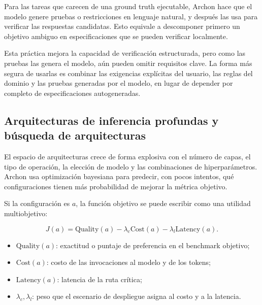 \documentclass[a4paper]{article}
\begin{document}
Para las tareas que carecen de una ground truth ejecutable, Archon hace que el modelo genere pruebas o restricciones en lenguaje natural, y después las usa para verificar las respuestas candidatas. Esto equivale a descomponer primero un objetivo ambiguo en especificaciones que se pueden verificar localmente.


Esta práctica mejora la capacidad de verificación estructurada, pero como las pruebas las genera el modelo, aún pueden omitir requisitos clave. La forma más segura de usarlas es combinar las exigencias explícitas del usuario, las reglas del dominio y las pruebas generadas por el modelo, en lugar de depender por completo de especificaciones autogeneradas.

\subsection{Arquitecturas de inferencia profundas y búsqueda de arquitecturas}


El espacio de arquitecturas crece de forma explosiva con el número de capas, el tipo de operación, la elección de modelo y las combinaciones de hiperparámetros. Archon usa optimización bayesiana para predecir, con pocos intentos, qué configuraciones tienen más probabilidad de mejorar la métrica objetivo.


Si la configuración es $a$, la función objetivo se puede escribir como una utilidad multiobjetivo:

$$
J(a)=\mathrm{Quality}(a)-\lambda_c\mathrm{Cost}(a)-\lambda_l\mathrm{Latency}(a).
$$

\begin{itemize}
    \item $\mathrm{Quality}(a)$: exactitud o puntaje de preferencia en el benchmark objetivo;
    \item $\mathrm{Cost}(a)$: costo de las invocaciones al modelo y de los tokens;
    \item $\mathrm{Latency}(a)$: latencia de la ruta crítica;
    \item $\lambda_c,\lambda_l$: peso que el escenario de despliegue asigna al costo y a la latencia.
\end{itemize}
\end{document}
